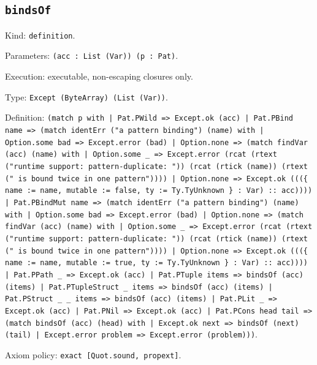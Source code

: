 \documentclass[11pt]{article}
\begin{document}
\subsection*{\texttt{bindsOf}}
\noindent Kind: \texttt{definition}.\par
\noindent Parameters: \texttt{(acc : List (Var)) (p : Pat)}.\par
\noindent Execution: executable, non-escaping closures only.\par
\noindent Type: \texttt{Except (ByteArray) (List (Var))}.\par
\noindent Definition: \texttt{(match p with | Pat.PWild => Except.ok (acc) | Pat.PBind name => (match identErr ("a pattern binding") (name) with | Option.some bad => Except.error (bad) | Option.none => (match findVar (acc) (name) with | Option.some \_ => Except.error (rcat (rtext ("runtime support: pattern-duplicate: ")) (rcat (rtick (name)) (rtext (" is bound twice in one pattern")))) | Option.none => Except.ok (((\{ name := name, mutable := false, ty := Ty.TyUnknown \} : Var) :: acc)))) | Pat.PBindMut name => (match identErr ("a pattern binding") (name) with | Option.some bad => Except.error (bad) | Option.none => (match findVar (acc) (name) with | Option.some \_ => Except.error (rcat (rtext ("runtime support: pattern-duplicate: ")) (rcat (rtick (name)) (rtext (" is bound twice in one pattern")))) | Option.none => Except.ok (((\{ name := name, mutable := true, ty := Ty.TyUnknown \} : Var) :: acc)))) | Pat.PPath \_ => Except.ok (acc) | Pat.PTuple items => bindsOf (acc) (items) | Pat.PTupleStruct \_ items => bindsOf (acc) (items) | Pat.PStruct \_ \_ items => bindsOf (acc) (items) | Pat.PLit \_ => Except.ok (acc) | Pat.PNil => Except.ok (acc) | Pat.PCons head tail => (match bindsOf (acc) (head) with | Except.ok next => bindsOf (next) (tail) | Except.error problem => Except.error (problem)))}.\par
\noindent Axiom policy: \texttt{exact [Quot.sound, propext]}.\par
\end{document}
